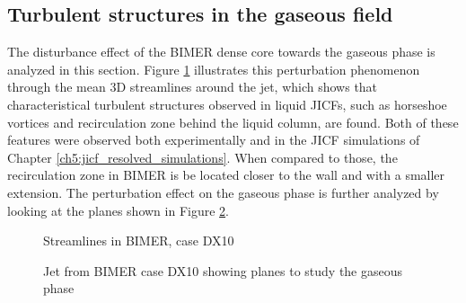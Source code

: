 \subsection{Turbulent structures in the gaseous field}
\label{subsec:ch8_turbulent_structures_BIMER}

The disturbance effect of the BIMER dense core towards the gaseous phase is analyzed in this section. Figure \ref{fig:streamlines_BIMER_from_dump} illustrates this perturbation phenomenon through the mean 3D streamlines around the jet, which shows that characteristical turbulent structures  observed in liquid JICFs, such as horseshoe vortices and recirculation zone behind the liquid column, are found. Both of these features were observed both experimentally and in the JICF simulations of Chapter \ref{ch5:jicf_resolved_simulations}. When compared to those, the recirculation zone in BIMER is be located closer to the wall and with a smaller extension. The perturbation effect on the gaseous phase is further analyzed by looking at the planes shown in Figure \ref{fig:BIMER_sps_with_gaseous_planes}. 

\begin{figure}[h!]
	\centering	{}
	\vspace*{-0.5in}
	\caption{Streamlines in BIMER, case DX10}
		\label{fig:streamlines_BIMER_from_dump}
\end{figure}


\begin{figure}[h!]
	\centering	{}
	\caption{Jet from BIMER case DX10 showing planes to study the gaseous phase}
	\label{fig:BIMER_sps_with_gaseous_planes}
\end{figure}

